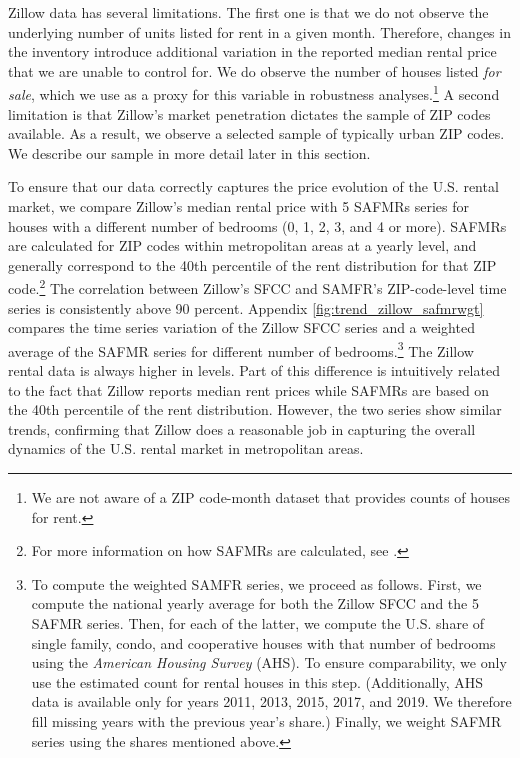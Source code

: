 Zillow data has several limitations. The first one is that we do not observe the 
underlying number of units listed for rent in a given month. Therefore, changes in the 
inventory introduce additional variation in the reported median rental price that we 
are unable to control for. We do observe the number of houses listed \textit{for sale}, 
which we use as a proxy for this variable in robustness analyses.\footnote{We are not 
	aware of a ZIP code-month dataset that provides counts of houses for rent.}
A second limitation is that Zillow's market penetration dictates the sample of ZIP codes 
available. As a result, we observe a selected sample of typically urban ZIP codes.
We describe our sample in more detail later in this section.

To ensure that our data correctly captures the price evolution of the U.S. rental market, 
we compare Zillow's median rental price with 5 SAFMRs series for houses with a different 
number of bedrooms (0, 1, 2, 3, and 4 or more). SAFMRs are calculated for ZIP codes within 
metropolitan areas at a yearly level, and generally correspond to the 40th percentile of 
the rent distribution for that ZIP code.\footnote{For more information on how SAFMRs are 
	calculated, see \textcite[][page 41641]{hudPreamble}.} 
The correlation between Zillow's SFCC and SAMFR's ZIP-code-level time series is 
consistently above 90 percent. Appendix \autoref{fig:trend_zillow_safmrwgt} compares the 
time series variation of the Zillow SFCC series and a weighted average of the SAFMR series 
for different number of bedrooms.\footnote{	\label{foot:zillow_time_series}
	To compute the weighted SAMFR series, we proceed as follows. First, we compute the 
	national yearly average for both the Zillow SFCC and the 5 SAFMR series. Then, for 
	each of the latter, we compute the U.S. share of single family, condo, and cooperative 
	houses with that number of bedrooms using the \textit{American Housing Survey} (AHS). 
	To ensure comparability, we only use the estimated count for rental houses in this 
	step. (Additionally, AHS data is available only for years 2011, 2013, 2015, 2017, and 
	2019. We therefore fill missing years with the previous year's share.) Finally, we 
	weight SAFMR series using the shares mentioned above.} 
The Zillow rental data is always higher in levels. Part of this difference is intuitively 
related to the fact that Zillow reports median rent prices while SAFMRs are based on the 
40th percentile of the rent distribution. However, the two series show similar trends, 
confirming that Zillow does a reasonable job in capturing the overall dynamics of the U.S. 
rental market in metropolitan areas.

